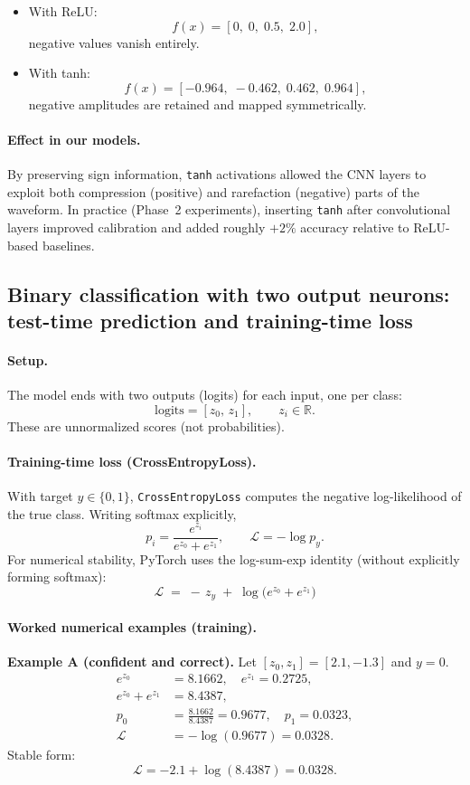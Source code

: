 \documentclass{article}
\begin{document}
\begin{itemize}
  \item With ReLU:
  \[
  f(x) = [0,\;0,\;0.5,\;2.0],
  \]
  negative values vanish entirely.
  \item With tanh:
  \[
  f(x) = [-0.964,\;-0.462,\;0.462,\;0.964],
  \]
  negative amplitudes are retained and mapped symmetrically.
\end{itemize}

\paragraph{Effect in our models.}
By preserving sign information, \texttt{tanh} activations allowed the CNN layers to exploit both compression (positive) and rarefaction (negative) parts of the waveform. In practice (Phase~2 experiments), inserting \texttt{tanh} after convolutional layers improved calibration and added roughly $+2\%$ accuracy relative to ReLU-based baselines.

\subsection{Binary classification with two output neurons: test-time prediction and training-time loss}

\paragraph{Setup.}
The model ends with two outputs (logits) for each input, one per class:
\[
\mathrm{logits} = [z_0,\, z_1],\qquad z_i\in\mathbb{R}.
\]
These are unnormalized scores (not probabilities).

\paragraph{Training-time loss (CrossEntropyLoss).}
With target \(y\in\{0,1\}\), \texttt{CrossEntropyLoss} computes the negative log-likelihood of the true class. Writing softmax explicitly,
\[
p_i=\frac{e^{z_i}}{e^{z_0}+e^{z_1}},\qquad
\mathcal{L}=-\log p_y.
\]
For numerical stability, PyTorch uses the log-sum-exp identity (without explicitly forming softmax):
\[
\boxed{\;\mathcal{L} \;=\; -\,z_y \;+\; \log\!\big(e^{z_0}+e^{z_1}\big)\;}
\]

\paragraph{Worked numerical examples (training).}
\textbf{Example A (confident and correct).} Let \([z_0,z_1]=[2.1,-1.3]\) and \(y=0\).
\[
\begin{aligned}
e^{z_0}&=8.1662, \quad e^{z_1}=0.2725,\\
e^{z_0}+e^{z_1}&=8.4387,\\
p_0&=\tfrac{8.1662}{8.4387}=0.9677,\quad p_1=0.0323,\\
\mathcal{L}&=-\log(0.9677)=0.0328.
\end{aligned}
\]
Stable form:
\[
\mathcal{L}=-2.1+\log(8.4387)=0.0328.
\]
\end{document}
